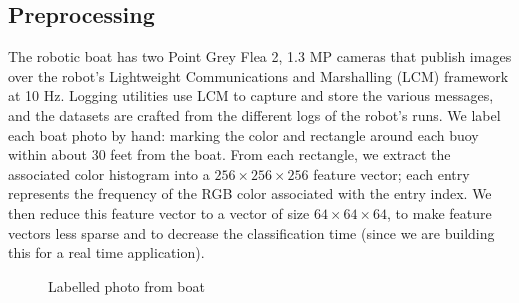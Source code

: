 \documentclass{article} %
\begin{document}
\subsection{Preprocessing}
The robotic boat has two Point Grey Flea 2, 1.3 MP %
cameras that publish images over the robot's Lightweight 
Communications and Marshalling (LCM) framework at 10 Hz. Logging utilities use LCM to capture and store the various messages, and the datasets are crafted from the different logs of the robot's runs. We label each boat photo by hand: marking the color and rectangle around each buoy within about 30 feet from the boat. From each rectangle, we extract the associated color histogram into a $256 \times 256 \times 256$ feature vector; each entry represents the frequency of the RGB color associated with the entry index. We then reduce this feature vector to a vector of size $64 \times 64 \times 64$, to make feature vectors less sparse and to decrease the classification time (since we are building this for a real time application).

\begin{figure}[h]
\begin{center}
\end{center}
\caption{Labelled photo from boat}
\end{figure}
\end{document}

